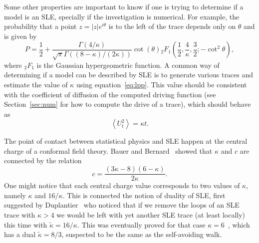 Some other properties are important to know if one is trying to determine if a
model is an SLE, specially if the investigation is numerical. For example, 
the probability that a point $z=|z|e^{i\theta}$ is to the left of the
trace depends only on $\theta$ and is given by
\begin{equation}
    \label{eq:lpp}
    P=\frac{1}{2}+
    \frac{\Gamma\left(4/\kappa\right)}
         {\sqrt{\pi}
          \Gamma\left(\left(8-\kappa\right)/\left(2\kappa\right)\right)}
    \cot\left(\theta\right)
    {}_{2}F_{1}\left(\frac{1}{2},\frac{4}{\kappa},\frac{3}{2};
        -\cot^{2}\theta\right),
\end{equation}
where ${}_2F_1$ is the Gaussian hypergeometric function. A common way of
determining if a model can be described by SLE is to generate various traces
and estimate the value of $\kappa$ using equation~\ref{eq:lpp}. This value
should be consistent with the coefficient of diffusion of the computed driving
function (see Section~\ref{sec:num} for how to compute the drive of a trace),
which should behave as
\begin{equation}
    \left\langle U_{t}^{2}\right\rangle =\kappa t.
\end{equation}

The point of contact between statistical physics and SLE happen at the
central charge of a conformal field theory. Bauer and Bernard~\cite{Bauer2002}
showed that $\kappa$ and $c$ are connected by the relation
\begin{equation}
    c=\frac{\left(3\kappa-8\right)\left(6-\kappa\right)}{2\kappa}.
\end{equation}
One might notice that each central charge value corresponds to two values of
$\kappa$, namely $\kappa$ and $16/\kappa$. This is connected the notion of
duality of SLE, first suggested by Duplantier~\cite{Duplantier2000} who noticed
that if we remove the loops of an SLE trace with $\kappa>4$ we would be left
with yet another SLE trace (at least locally) this time with
$\tilde{\kappa}=16/\kappa$. This was eventually proved for that case
$\kappa=6$~\cite{Beffara2004}, which has a dual $\tilde{\kappa}=8/3$, suspected
to be the same as the self-avoiding walk.

